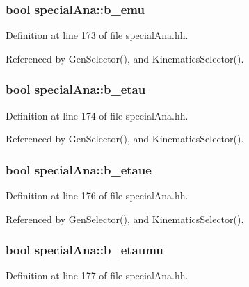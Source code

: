 \subsubsection[{b\-\_\-emu}]{\setlength{\rightskip}{0pt plus 5cm}bool special\-Ana\-::b\-\_\-emu}\label{classspecialAna_aae4e34dea84468db09355f5c33ac58dd}


Definition at line 173 of file special\-Ana.\-hh.



Referenced by Gen\-Selector(), and Kinematics\-Selector().

\subsubsection[{b\-\_\-etau}]{\setlength{\rightskip}{0pt plus 5cm}bool special\-Ana\-::b\-\_\-etau}\label{classspecialAna_a14aecaa955dbd8cb22e22107c1991ebe}


Definition at line 174 of file special\-Ana.\-hh.



Referenced by Gen\-Selector(), and Kinematics\-Selector().

\subsubsection[{b\-\_\-etaue}]{\setlength{\rightskip}{0pt plus 5cm}bool special\-Ana\-::b\-\_\-etaue}\label{classspecialAna_ab6038122295663c5a43fe1e89c86ae36}


Definition at line 176 of file special\-Ana.\-hh.



Referenced by Gen\-Selector(), and Kinematics\-Selector().

\subsubsection[{b\-\_\-etaumu}]{\setlength{\rightskip}{0pt plus 5cm}bool special\-Ana\-::b\-\_\-etaumu}\label{classspecialAna_a1ea533f85d436109263a69b2943b906b}


Definition at line 177 of file special\-Ana.\-hh.



